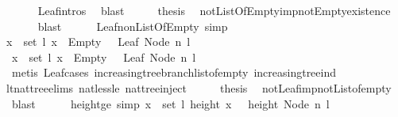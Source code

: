 \begin{isabellebody}
\ \ \ \ \isamarkupfalse%
\ Leaf{\isachardot}intros\ \isamarkupfalse%
\ blast\isanewline
\ \ \isamarkupfalse%
\ \isamarkupfalse%
\ {\isacharquery}thesis\ \isamarkupfalse%
\ not{\isacharunderscore}ListOfEmpty{\isacharunderscore}imp{\isacharunderscore}not{\isacharunderscore}Empty{\isacharunderscore}existence\isanewline
\ \ \ \ \isamarkupfalse%
\ blast\ \isanewline
{}\isamarkupfalse%
%
\endisatagproof
{\isafoldproof}%
%
\isadelimproof
\isanewline
%
\endisadelimproof
\ \ \ \isanewline
{}\isamarkupfalse%
\ Leaf{\isacharunderscore}non{\isacharunderscore}ListOfEmpty\ {\isacharbrackleft}simp{\isacharbrackright}{\isacharcolon}\ \isanewline
{\isachardoublequoteopen}{\isacharparenleft}{\isasymexists}x\ {\isasymin}\ set\ l{\isachardot}\ x\ {\isasymnoteq}\ Empty{\isacharparenright}\ {\isacharequal}\ {\isacharparenleft}{\isasymnot}\ Leaf\ {\isacharparenleft}Node\ n\ l{\isacharparenright}{\isacharparenright}{\isachardoublequoteclose}\isanewline
%
\isadelimproof
%
\endisadelimproof
%
\isatagproof
{}\isamarkupfalse%
\ {\isacharminus}\isanewline
\ \ \isamarkupfalse%
\ {\isachardoublequoteopen}{\isacharparenleft}{\isasymexists}x\ {\isasymin}\ set\ l{\isachardot}\ x\ {\isasymnoteq}\ Empty{\isacharparenright}\ {\isasymlongrightarrow}\ {\isacharparenleft}{\isasymnot}\ Leaf\ {\isacharparenleft}Node\ n\ l{\isacharparenright}{\isacharparenright}{\isachardoublequoteclose}\isanewline
\ \ \ \ \isamarkupfalse%
\ {\isacharparenleft}metis\ Leaf{\isachardot}cases\ increasing{\isacharunderscore}tree{\isacharunderscore}branch{\isacharunderscore}list{\isacharunderscore}of{\isacharunderscore}empty\ increasing{\isacharunderscore}tree{\isacharunderscore}ind\ \isanewline
lt{\isacharunderscore}nat{\isacharunderscore}tree{\isachardot}elims{\isacharparenleft}{}{\isacharparenright}\ nat{\isacharunderscore}less{\isacharunderscore}le\ nattree{\isachardot}inject{\isacharparenright}\isanewline
\ \ \isamarkupfalse%
\ \isamarkupfalse%
\ {\isacharquery}thesis\ \isamarkupfalse%
\ not{\isacharunderscore}Leaf{\isacharunderscore}imp{\isacharunderscore}not{\isacharunderscore}List{\isacharunderscore}of{\isacharunderscore}empty\ \isamarkupfalse%
\ blast\isanewline
{}\isamarkupfalse%
%
\endisatagproof
{\isafoldproof}%
%
\isadelimproof
\isanewline
%
\endisadelimproof
\ \ \ \ \isanewline
{}\isamarkupfalse%
\ height{\isacharunderscore}ge\ {\isacharbrackleft}simp{\isacharbrackright}{\isacharcolon}\ {\isachardoublequoteopen}{\isasymforall}x\ {\isasymin}\ set\ l{\isachardot}\ height\ x\ \ {\isasymle}\ height\ {\isacharparenleft}Node\ n\ l{\isacharparenright}{\isachardoublequoteclose}\isanewline

\end{isabellebody}

